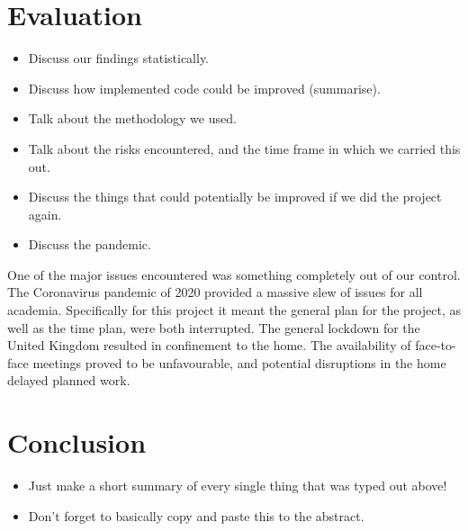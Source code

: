 \documentclass{article}
\begin{document}
\section{Evaluation}
\begin{itemize}
    \item Discuss our findings statistically.
    \item Discuss how implemented code could be improved (summarise).
    \item Talk about the methodology we used.
    \item Talk about the risks encountered, and the time frame in which we carried this out.
    \item Discuss the things that could potentially be improved if we did the project again.
    \item Discuss the pandemic.
\end{itemize}
One of the major issues encountered was something completely out of our control. The Coronavirus pandemic of 2020 provided a massive slew of issues for all academia. Specifically for this project it meant the general plan for the project, as well as the time plan, were both interrupted. The general lockdown for the United Kingdom resulted in confinement to the home. The availability of face-to-face meetings proved to be unfavourable, and potential disruptions in the home delayed planned work. 

\section{Conclusion}
\begin{itemize}
    \item Just make a short summary of every single thing that was typed out above!
    \item Don't forget to basically copy and paste this to the abstract.
\end{itemize}


\newpage


\end{document}
